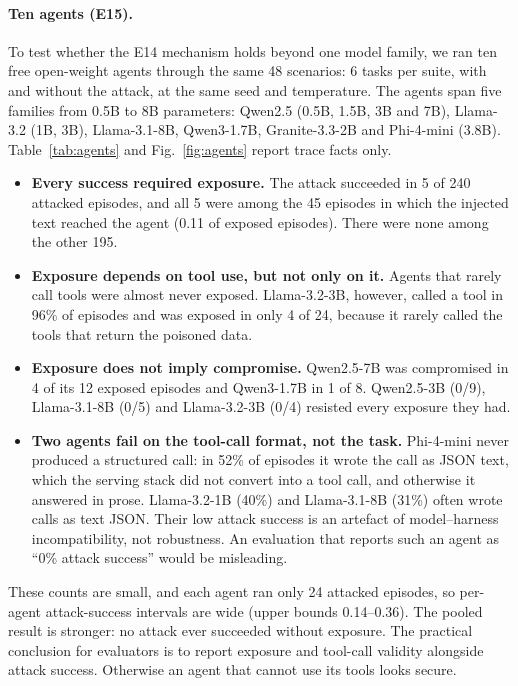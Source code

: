 \documentclass[11pt]{article}
\theoremstyle{definition}
\begin{document}
\paragraph{Ten agents (E15).} To test whether the E14 mechanism holds beyond one model family, we ran ten free open-weight agents through the same 48 scenarios: 6 tasks per suite, with and without the attack, at the same seed and temperature. The agents span five families from 0.5B to 8B parameters: Qwen2.5 (0.5B, 1.5B, 3B and 7B), Llama-3.2 (1B, 3B), Llama-3.1-8B, Qwen3-1.7B, Granite-3.3-2B and Phi-4-mini (3.8B). Table~\ref{tab:agents} and Fig.~\ref{fig:agents} report trace facts only.
\begin{itemize}
\item \textbf{Every success required exposure.} The attack succeeded in 5 of 240 attacked episodes, and all 5 were among the 45 episodes in which the injected text reached the agent (0.11 of exposed episodes). There were none among the other 195.
\item \textbf{Exposure depends on tool use, but not only on it.} Agents that rarely call tools were almost never exposed. Llama-3.2-3B, however, called a tool in 96\% of episodes and was exposed in only 4 of 24, because it rarely called the tools that return the poisoned data.
\item \textbf{Exposure does not imply compromise.} Qwen2.5-7B was compromised in 4 of its 12 exposed episodes and Qwen3-1.7B in 1 of 8. Qwen2.5-3B (0/9), Llama-3.1-8B (0/5) and Llama-3.2-3B (0/4) resisted every exposure they had.
\item \textbf{Two agents fail on the tool-call format, not the task.} Phi-4-mini never produced a structured call: in 52\% of episodes it wrote the call as JSON text, which the serving stack did not convert into a tool call, and otherwise it answered in prose. Llama-3.2-1B (40\%) and Llama-3.1-8B (31\%) often wrote calls as text JSON. Their low attack success is an artefact of model--harness incompatibility, not robustness. An evaluation that reports such an agent as ``0\% attack success'' would be misleading.
\end{itemize}
These counts are small, and each agent ran only 24 attacked episodes, so per-agent attack-success intervals are wide (upper bounds 0.14--0.36). The pooled result is stronger: no attack ever succeeded without exposure. The practical conclusion for evaluators is to report exposure and tool-call validity alongside attack success. Otherwise an agent that cannot use its tools looks secure.
\end{document}
